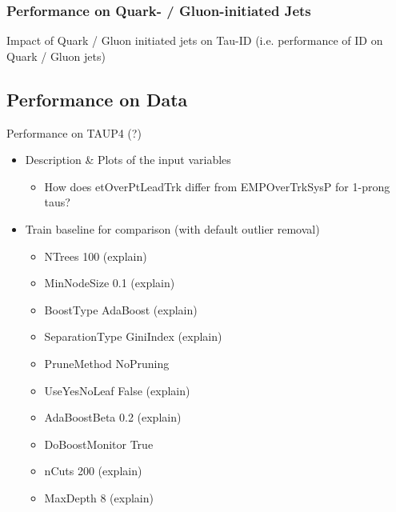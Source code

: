 \subsubsection{Performance on Quark- / Gluon-initiated Jets}
\label{sec:bdt_perf_quark_gluon}

Impact of Quark / Gluon initiated jets on Tau-ID (i.e. performance of ID
on Quark / Gluon jets)

\subsection{Performance on Data}
\label{sec:bdt_perf_data}

Performance on TAUP4 (?)

\begin{itemize}
\item Description \& Plots of the input variables
  \begin{itemize}
  \item How does etOverPtLeadTrk differ from EMPOverTrkSysP for 1-prong taus?
  \end{itemize}

\item Train baseline for comparison (with default outlier removal)
  \begin{itemize}
  \item NTrees 100 (explain)
  \item MinNodeSize 0.1 (explain)
  \item BoostType AdaBoost (explain)
  \item SeparationType GiniIndex (explain)
  \item PruneMethod NoPruning
  \item UseYesNoLeaf False (explain)
  \item AdaBoostBeta 0.2 (explain)
  \item DoBoostMonitor True
  \item nCuts 200 (explain)
  \item MaxDepth 8 (explain)
  \end{itemize}


\end{itemize}
